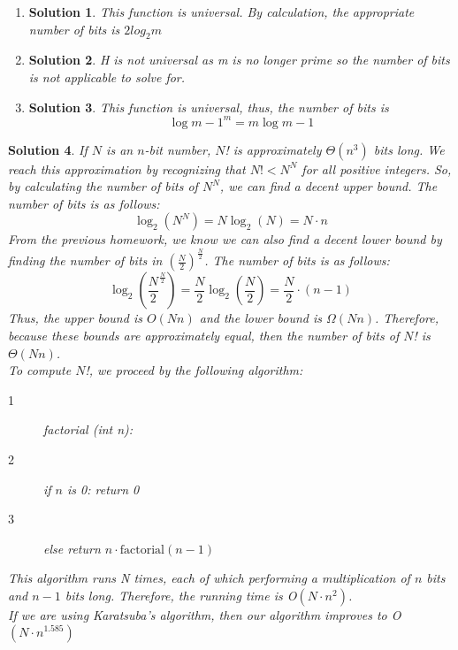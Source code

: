 \documentclass[boxes]{rutgers_hw}
\newtheorem*{solutions}{Solution}
\begin{document}
\begin{exern}{1.29}
\end{exern}
\begin{enumerate}
    \item
        \begin{solutions}
            This function is universal. By calculation, the appropriate number of bits is $2log_{2}{m}$
        \end{solutions}
    \item
        \begin{solutions}
            H is not universal as m is no longer prime so the number of bits is not applicable to solve for.
        \end{solutions}
    \item
        \begin{solutions}
            This function is universal, thus, the number of bits is 
            \[\log{m-1^{m}} = m\log{m-1}\]
        \end{solutions}
\end{enumerate}

\pagebreak

\begin{exern}{1.31}
\end{exern}
\begin{solutions}
    If $N$ is an $n$-bit number, $N$! is approximately $\Theta(n^3)$ bits long.
    We reach this approximation by recognizing that $N! < N^N$ for all positive integers. 
    So, by calculating the number of bits of $N^N$, we can find a decent upper bound.
    The number of bits is as follows:
    \[ \log_2{\left(N^N\right)} = N\log_2{(N)} = N \cdot n\]
    From the previous homework, we know we can also find a decent lower bound by finding the number of bits in ${\left(\frac{N}2\right)}^{\frac{N}2}$.
    The number of bits is as follows:
    \[ \log_2{\left({\frac{N}2}^{\frac{N}2}\right)} = {\frac{N}2}\log_2{({\frac{N}2})} = {\frac{N}2} \cdot {(n-1)}\]
    Thus, the upper bound is $O(Nn)$ and the lower bound is $\Omega(Nn)$. 
    Therefore, because these bounds are approximately equal, then the number of bits of $N$! is $\Theta(Nn)$.
    \hfill \break \\
    To compute $N$!, we proceed by the following algorithm:
    \begin{description}
        \item[1] factorial (int n):
        \item[2] \hspace{5 mm} if $n$ is 0: return 0
        \item[3] \hspace{5 mm} else return $n \cdot \text{factorial}(n-1)$
    \end{description}
    This algorithm runs N times, each of which performing a multiplication of $n$ bits and $n-1$ bits long.
    Therefore, the running time is O$(N\cdot n^2)$.
    \hfill \break \\
    If we are using Karatsuba's algorithm, then our algorithm improves to O$(N\cdot n^{1.585})$
\end{solutions}
\end{document}
